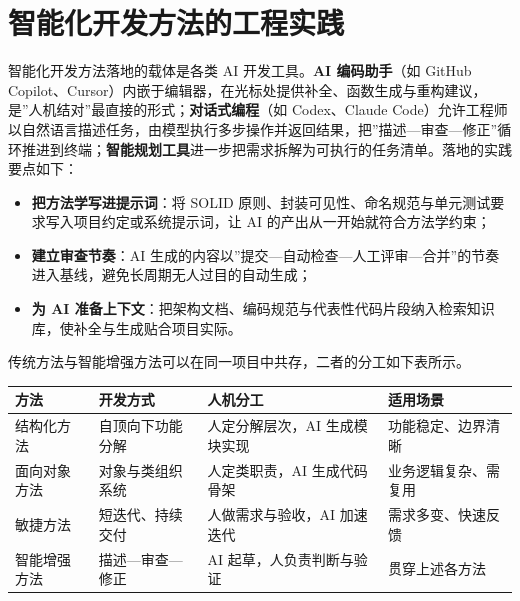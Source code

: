 \documentclass[
]{ctexbook}
\providecommand{\tightlist}{\setlength{\itemsep}{0pt}\setlength{\parskip}{0pt} }
\newcounter{none}
\begin{document}
\section{智能化开发方法的工程实践}\label{ux667aux80fdux5316ux5f00ux53d1ux65b9ux6cd5ux7684ux5de5ux7a0bux5b9eux8df5}

智能化开发方法落地的载体是各类 AI 开发工具。\textbf{AI 编码助手}（如
GitHub
Copilot、Cursor）内嵌于编辑器，在光标处提供补全、函数生成与重构建议，是''人机结对''最直接的形式；\textbf{对话式编程}（如
Codex、Claude
Code）允许工程师以自然语言描述任务，由模型执行多步操作并返回结果，把''描述---审查---修正''循环推进到终端；\textbf{智能规划工具}进一步把需求拆解为可执行的任务清单。落地的实践要点如下：

\begin{itemize}
\tightlist
\item
  \textbf{把方法学写进提示词}：将 SOLID
  原则、封装可见性、命名规范与单元测试要求写入项目约定或系统提示词，让
  AI 的产出从一开始就符合方法学约束；
\item
  \textbf{建立审查节奏}：AI
  生成的内容以''提交---自动检查---人工评审---合并''的节奏进入基线，避免长周期无人过目的自动生成；
\item
  \textbf{为 AI
  准备上下文}：把架构文档、编码规范与代表性代码片段纳入检索知识库，使补全与生成贴合项目实际。
\end{itemize}

传统方法与智能增强方法可以在同一项目中共存，二者的分工如下表所示。

{\def\LTcaptype{none} %
\begin{longtable}[]{@{}
  >{\raggedright\arraybackslash}p{}
  >{\raggedright\arraybackslash}p{}
  >{\raggedright\arraybackslash}p{}
  >{\raggedright\arraybackslash}p{}@{}}
\toprule\noalign{}
\begin{minipage}[b]{\linewidth}\raggedright
方法
\end{minipage} & \begin{minipage}[b]{\linewidth}\raggedright
开发方式
\end{minipage} & \begin{minipage}[b]{\linewidth}\raggedright
人机分工
\end{minipage} & \begin{minipage}[b]{\linewidth}\raggedright
适用场景
\end{minipage} \\
\midrule\noalign{}
\endhead
\bottomrule\noalign{}
\endlastfoot
结构化方法 & 自顶向下功能分解 & 人定分解层次，AI 生成模块实现 &
功能稳定、边界清晰 \\
面向对象方法 & 对象与类组织系统 & 人定类职责，AI 生成代码骨架 &
业务逻辑复杂、需复用 \\
敏捷方法 & 短迭代、持续交付 & 人做需求与验收，AI 加速迭代 &
需求多变、快速反馈 \\
智能增强方法 & 描述---审查---修正 & AI 起草，人负责判断与验证 &
贯穿上述各方法 \\
\end{longtable}
}
\end{document}
